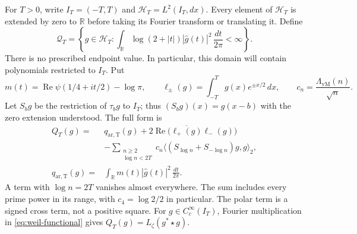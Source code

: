\documentclass[11pt]{article}
\theoremstyle{definition}
\theoremstyle{remark}
\numberwithin{equation}{section}
\newcommand{\R}{\mathbb R}
\begin{document}
For $T>0$, write $I_T=(-T,T)$ and $\mathcal H_T=L^2(I_T,dx)$.
Every element of $\mathcal H_T$ is extended by zero to $\R$ before
taking its Fourier transform or translating it.  Define
\begin{equation}
 \mathcal Q_T=\left\{g\in\mathcal H_T:
  \int_\R\log(2+|t|)|\widehat g(t)|^2\,\frac{dt}{2\pi}<\infty\right\}.
 \label{eq:window-domain}
\end{equation}
There is no prescribed endpoint value.  In particular, this domain
will contain polynomials restricted to $I_T$.
Put
\[
 m(t)=\operatorname{Re}\psi(1/4+it/2)-\log\pi,
 \qquad \ell_\pm(g)=\int_{-T}^Tg(x)e^{\pm x/2}\,dx,
 \qquad c_n=\frac{\Lambda_{\mathrm{vM}}(n)}{\sqrt n}.
\]
Let $S_b g$ be the restriction of $\tau_b g$ to $I_T$; thus
$(S_b g)(x)=g(x-b)$ with the zero extension understood.  The full form is
\begin{equation}
\begin{split}
 Q_T(g)={}&q_{\mathrm{ar,T}}(g)
       +2\operatorname{Re}\bigl(\overline{\ell_+(g)}\ell_-(g)\bigr)\\
 &-\sum_{\substack{n\ge2\\\log n<2T}}
       c_n\langle(S_{\log n}+S_{-\log n})g,g\rangle_2,\\
 q_{\mathrm{ar,T}}(g)={}&\int_\R m(t)|\widehat g(t)|^2\,\frac{dt}{2\pi}.
\end{split}
\label{eq:window-form}
\end{equation}
A term with $\log n=2T$ vanishes almost everywhere.  The sum includes
every prime power in its range, with $c_4=\log2/2$ in particular.
The polar term is a signed cross term, not a positive square.
For $g\in C_c^\infty(I_T)$, Fourier multiplication in
\eqref{eq:weil-functional} gives
$Q_T(g)=L_\zeta(g^*\star g)$.
\end{document}

